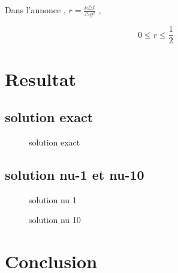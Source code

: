 \documentclass[a4paper,10pt]{report} %
\begin{document}
Dans l'annonce , $r=\frac{\nu\triangle t}{\triangle y^2}$ ,

$$0\leq r\leq\frac{1}{2}$$

\chapter{Resultat}

\section{solution exact}
\begin{figure}[h]
\begin{center}
\end{center}
\caption{solution exact}
\label{fig:figureCoorPol}
\end{figure}

\section{solution nu-1 et nu-10}
\begin{figure}[h]
\begin{center}
\end{center}
\caption{solution nu 1}
\label{fig:figureCoorPol}
\end{figure}
\begin{figure}[h]
\begin{center}
\end{center}
\caption{solution nu 10}
\label{fig:figureCoorPol}
\end{figure}


\chapter{Conclusion}
\end{document}
